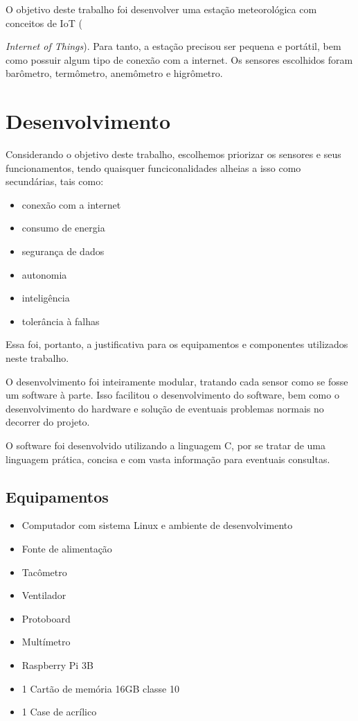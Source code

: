 \documentclass[twocolumn,11pt]{article}
\begin{document}
O objetivo deste trabalho foi desenvolver uma estação meteorológica com conceitos de IoT ({\textit{Internet of Things}). Para tanto, a estação precisou ser pequena e portátil, bem como possuir algum tipo de conexão com a internet. Os sensores escolhidos foram barômetro, termômetro, anemômetro e higrômetro.
\section{Desenvolvimento}\label{desenvolvimento}
Considerando o objetivo deste trabalho, escolhemos priorizar os sensores e seus funcionamentos, tendo quaisquer funciconalidades alheias a isso como secundárias, tais como:
\begin{itemize}
\item conexão com a internet
\item consumo de energia
\item segurança de dados
\item autonomia
\item inteligência
\item tolerância à falhas
\end{itemize}
Essa foi, portanto, a justificativa para os equipamentos e componentes utilizados neste trabalho.\par
O desenvolvimento foi inteiramente modular, tratando cada sensor como se fosse um software à parte. Isso facilitou o desenvolvimento do software, bem como o desenvolvimento do hardware e solução de eventuais problemas normais no decorrer do projeto.\par
O software foi desenvolvido utilizando a linguagem C, por se tratar de uma linguagem prática, concisa e com vasta informação para eventuais consultas.\par
\subsection{Equipamentos}\label{desenvolvimento_equipamentos}
\begin{itemize}
\item Computador com sistema Linux e ambiente de desenvolvimento
\item Fonte de alimentação
\item Tacômetro
\item Ventilador
\item Protoboard
\item Multímetro
\item Raspberry Pi 3B
\item 1 Cartão de memória 16GB classe 10
\item 1 Case de acrílico
\end{itemize}
}
\end{document}
